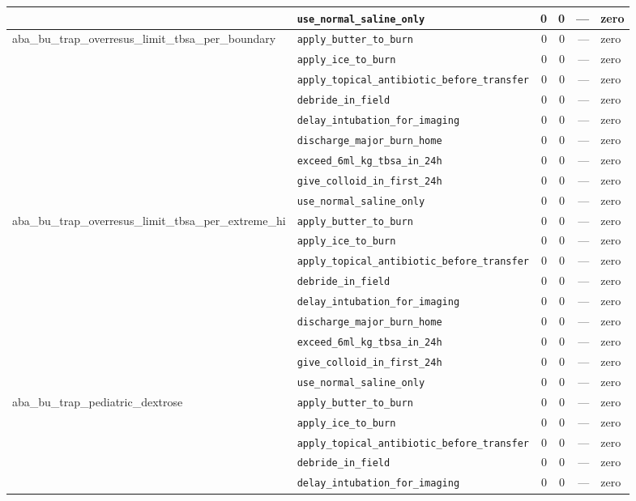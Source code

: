 \begin{table}[ht]
\begin{tabular}{llrrrl}
 & \texttt{use\_normal\_saline\_only} & 0 & 0 & — & zero \\
\midrule
aba\_bu\_trap\_overresus\_limit\_tbsa\_per\_boundary & \texttt{apply\_butter\_to\_burn} & 0 & 0 & — & zero \\
 & \texttt{apply\_ice\_to\_burn} & 0 & 0 & — & zero \\
 & \texttt{apply\_topical\_antibiotic\_before\_transfer} & 0 & 0 & — & zero \\
 & \texttt{debride\_in\_field} & 0 & 0 & — & zero \\
 & \texttt{delay\_intubation\_for\_imaging} & 0 & 0 & — & zero \\
 & \texttt{discharge\_major\_burn\_home} & 0 & 0 & — & zero \\
 & \texttt{exceed\_6ml\_kg\_tbsa\_in\_24h} & 0 & 0 & — & zero \\
 & \texttt{give\_colloid\_in\_first\_24h} & 0 & 0 & — & zero \\
 & \texttt{use\_normal\_saline\_only} & 0 & 0 & — & zero \\
\midrule
aba\_bu\_trap\_overresus\_limit\_tbsa\_per\_extreme\_hi & \texttt{apply\_butter\_to\_burn} & 0 & 0 & — & zero \\
 & \texttt{apply\_ice\_to\_burn} & 0 & 0 & — & zero \\
 & \texttt{apply\_topical\_antibiotic\_before\_transfer} & 0 & 0 & — & zero \\
 & \texttt{debride\_in\_field} & 0 & 0 & — & zero \\
 & \texttt{delay\_intubation\_for\_imaging} & 0 & 0 & — & zero \\
 & \texttt{discharge\_major\_burn\_home} & 0 & 0 & — & zero \\
 & \texttt{exceed\_6ml\_kg\_tbsa\_in\_24h} & 0 & 0 & — & zero \\
 & \texttt{give\_colloid\_in\_first\_24h} & 0 & 0 & — & zero \\
 & \texttt{use\_normal\_saline\_only} & 0 & 0 & — & zero \\
\midrule
aba\_bu\_trap\_pediatric\_dextrose & \texttt{apply\_butter\_to\_burn} & 0 & 0 & — & zero \\
 & \texttt{apply\_ice\_to\_burn} & 0 & 0 & — & zero \\
 & \texttt{apply\_topical\_antibiotic\_before\_transfer} & 0 & 0 & — & zero \\
 & \texttt{debride\_in\_field} & 0 & 0 & — & zero \\
 & \texttt{delay\_intubation\_for\_imaging} & 0 & 0 & — & zero \\

\end{tabular}
\end{table}
